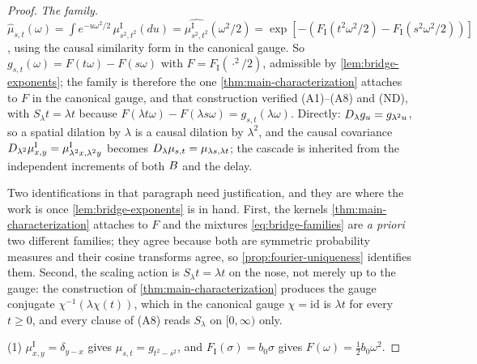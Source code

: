 \begin{proof}
\leanok
\emph{The family.} $\hat\mu_{s,t}(\omega) = \int e^{-u\omega^2/2}\,\mu^{\mathrm I}_{s^2,t^2}(du)
= \widehat{\mu^{\mathrm I}_{s^2,t^2}}(\omega^2/2)
= \exp[-(F_{\mathrm I}(t^2\omega^2/2) - F_{\mathrm I}(s^2\omega^2/2))]$, using the causal
similarity form in the canonical gauge. So $g_{s,t}(\omega) = F(t\omega) - F(s\omega)$ with
$F = F_{\mathrm I}(\cdot^2/2)$, admissible by \ref{lem:bridge-exponents}; the family is
therefore the one \ref{thm:main-characterization} attaches to $F$ in the canonical gauge, and
that construction verified (A1)--(A8) and (ND), with $S_\lambda t = \lambda t$ because
$F(\lambda t\omega) - F(\lambda s\omega) = g_{s,t}(\lambda\omega)$. Directly:
$D_{\lambda}g_u = g_{\lambda^2u}$, so a spatial dilation by $\lambda$ is a causal dilation by
$\lambda^2$, and the causal covariance
$D_{\lambda^2}\mu^{\mathrm I}_{x,y} = \mu^{\mathrm I}_{\lambda^2x,\lambda^2y}$ becomes
$D_{\lambda}\mu_{s,t} = \mu_{\lambda s,\lambda t}$; the cascade is inherited from the
independent increments of both $B$ and the delay.

Two identifications in that paragraph need justification, and they are where the work is
once \ref{lem:bridge-exponents} is in hand. First, the kernels \ref{thm:main-characterization}
attaches to $F$ and the mixtures \ref{eq:bridge-families} are \emph{a priori} two different
families; they agree because both are symmetric probability measures and their cosine
transforms agree, so \ref{prop:fourier-uniqueness} identifies them. Second, the scaling action
is $S_\lambda t = \lambda t$ on the nose, not merely up to the gauge: the construction of
\ref{thm:main-characterization} produces the gauge conjugate $\chi^{-1}(\lambda\chi(t))$, which
in the canonical gauge $\chi = \mathrm{id}$ is $\lambda t$ for every $t \ge 0$, and every clause
of (A8) reads $S_\lambda$ on $[0,\infty)$ only.

(1) $\mu^{\mathrm I}_{x,y} = \delta_{y-x}$ gives $\mu_{s,t} = g_{t^2-s^2}$, and
$F_{\mathrm I}(\sigma) = b_0\sigma$ gives $F(\omega) = \tfrac12 b_0\omega^2$.


\end{proof}
